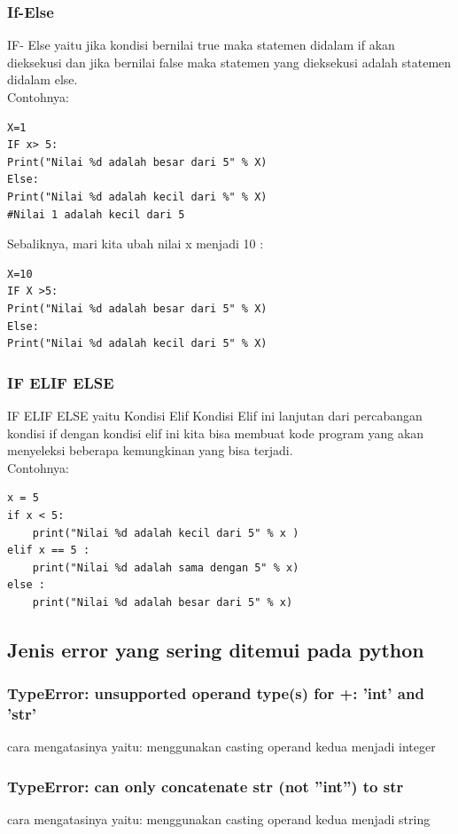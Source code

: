 \documentclass[12pt, times new roman, a4paper]{article}
\begin{document}
\subsubsection{If-Else}
IF- Else yaitu jika kondisi bernilai true maka statemen didalam if akan
dieksekusi dan jika bernilai false maka statemen yang dieksekusi adalah
statemen didalam else.\\
Contohnya:
\begin{verbatim}
X=1
IF x> 5:
Print("Nilai %d adalah besar dari 5" % X)
Else:
Print("Nilai %d adalah kecil dari %" % X)
#Nilai 1 adalah kecil dari 5
\end{verbatim}
Sebaliknya, mari kita ubah nilai x menjadi 10 :\\
\begin{verbatim}
X=10
IF X >5:
Print("Nilai %d adalah besar dari 5" % X)
Else:
Print("Nilai %d adalah kecil dari 5" % X)
\end{verbatim}
\subsubsection{IF ELIF ELSE}
IF ELIF ELSE yaitu Kondisi Elif Kondisi Elif ini lanjutan dari percabangan kondisi if dengan kondisi elif ini kita bisa membuat kode program yang
akan menyeleksi beberapa kemungkinan yang bisa terjadi.\\
Contohnya:
\begin{verbatim}
x = 5
if x < 5:
	print("Nilai %d adalah kecil dari 5" % x )
elif x == 5 :
	print("Nilai %d adalah sama dengan 5" % x)
else :
	print("Nilai %d adalah besar dari 5" % x)
\end{verbatim}
 
\subsection{Jenis error yang sering ditemui pada python}
\subsubsection{ TypeError: unsupported operand type(s) for +: ’int’ and ’str’}
cara mengatasinya yaitu: menggunakan casting operand kedua menjadi
integer\\
\subsubsection{TypeError: can only concatenate str (not ”int”) to str}
cara mengatasinya yaitu: menggunakan casting operand kedua menjadi
string\\
\end{document}
